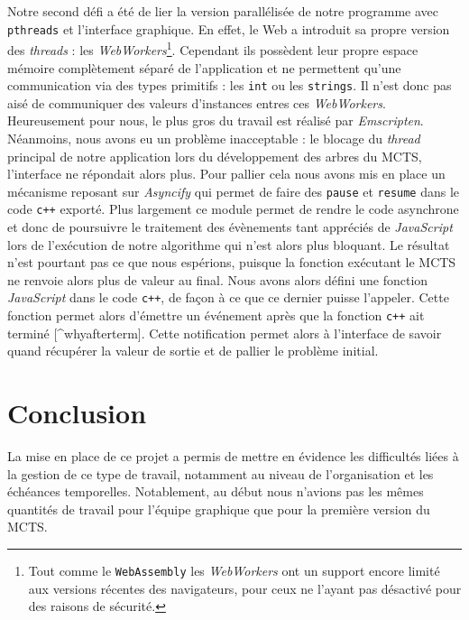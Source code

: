 \documentclass[a4paper,11pt]{article}
\begin{document}
Notre second défi a été de lier la version parallélisée de notre
programme avec \texttt{pthreads}\citep{pthreads_emscripten} et
l'interface graphique. En effet, le Web a introduit sa propre version
des \emph{threads} : les \emph{WebWorkers}\footnote{Tout comme le
  \texttt{WebAssembly} les \emph{WebWorkers} ont un support encore
  limité aux versions récentes des navigateurs, pour ceux ne l'ayant pas
  désactivé pour des raisons de sécurité.}. Cependant ils possèdent leur
propre espace mémoire complètement séparé de l'application et ne
permettent qu'une communication via des types primitifs : les
\texttt{int} ou les \texttt{strings}. Il n'est donc pas aisé de
communiquer des valeurs d'instances entres ces \emph{WebWorkers}.
Heureusement pour nous, le plus gros du travail est réalisé par
\emph{Emscripten}. Néanmoins, nous avons eu un problème inacceptable :
le blocage du \emph{thread} principal de notre application lors du
développement des arbres du MCTS, l'interface ne répondait alors plus.
Pour pallier cela nous avons mis en place un mécanisme reposant sur
\emph{Asyncify} \citep{asyncify} qui permet de faire des \texttt{pause}
et \texttt{resume} dans le code \texttt{c++} exporté. Plus largement ce
module permet de rendre le code asynchrone et donc de poursuivre le
traitement des évènements tant appréciés de \emph{JavaScript} lors de
l'exécution de notre algorithme qui n'est alors plus bloquant. Le
résultat n'est pourtant pas ce que nous espérions, puisque la fonction
exécutant le MCTS ne renvoie alors plus de valeur au final. Nous avons
alors défini une fonction \emph{JavaScript} dans le code \texttt{c++},
de façon à ce que ce dernier puisse l'appeler. Cette fonction permet
alors d'émettre un événement après que la fonction \texttt{c++} ait
terminé {[}\^{}whyafterterm{]}. Cette notification permet alors à
l'interface de savoir quand récupérer la valeur de sortie et de pallier
le problème initial.

\section*{Conclusion}\label{conclusion}

La mise en place de ce projet a permis de mettre en évidence les
difficultés liées à la gestion de ce type de travail, notamment au
niveau de l'organisation et les échéances temporelles. Notablement, au
début nous n'avions pas les mêmes quantités de travail pour l'équipe
graphique que pour la première version du MCTS.
\end{document}
